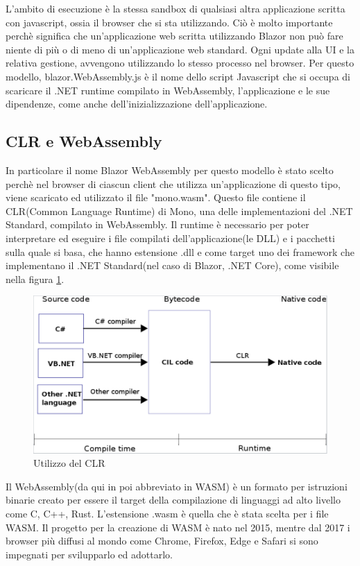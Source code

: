 L'ambito di esecuzione \`e la stessa sandbox di qualsiasi altra applicazione scritta con javascript, ossia il browser che si sta utilizzando.
Ci\`o \`e molto importante perch\`e significa che un'applicazione web scritta utilizzando Blazor non pu\`o fare niente di pi\`u o di meno di un'applicazione web standard.
Ogni update alla UI e la relativa gestione, avvengono utilizzando lo stesso processo nel browser.
Per questo modello, blazor.WebAssembly.js \`e il nome dello script Javascript che si occupa di scaricare il .NET runtime compilato in WebAssembly, l'applicazione e le sue dipendenze, come anche dell'inizializzazione dell'applicazione.

\subsection{CLR e WebAssembly}\label{sez:webAssembly}
In particolare il nome Blazor WebAssembly per questo modello \`e stato scelto perch\`e nel browser di ciascun client che utilizza un'applicazione di questo tipo, viene scaricato ed utilizzato il file "mono.wasm".
Questo file contiene il CLR(Common Language Runtime) di Mono, una delle implementazioni del .NET Standard, compilato in WebAssembly.
Il runtime \`e necessario per poter interpretare ed eseguire i file compilati dell'applicazione(le DLL) e i pacchetti sulla quale si basa, che hanno estensione .dll e come target uno dei framework che implementano il .NET Standard(nel caso di Blazor, .NET Core), come visibile nella figura \ref{fig:CLR}.

\begin{figure}[H]
	\centerline{\includegraphics[scale=0.5]{figure/CLR.PNG}}
	\caption{Utilizzo del CLR}
	\label{fig:CLR}
\end{figure}

Il WebAssembly(da qui in poi abbreviato in WASM) \`e un formato per istruzioni binarie creato per essere il target della compilazione di linguaggi ad alto livello come C, C++, Rust\cite{webAssemblyOfficialWebsite}.
L'estensione .wasm \`e quella che \`e stata scelta per i file WASM.
Il progetto per la creazione di WASM \`e nato nel 2015, mentre dal 2017 i browser pi\`u diffusi al mondo come Chrome, Firefox, Edge e Safari si sono impegnati per svilupparlo ed adottarlo\cite{webAssemblySupport}.

